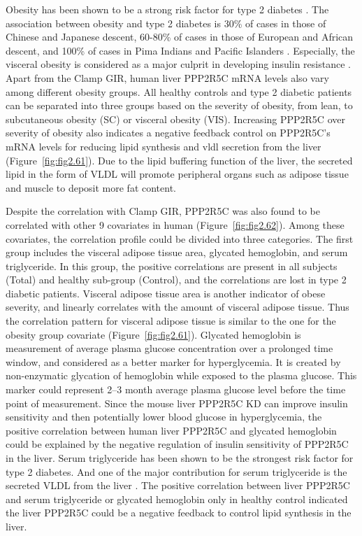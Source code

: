 Obesity has been shown to be a strong risk factor for type 2 diabetes \cite{stumvoll_type_2005}. The association between obesity and type 2 diabetes is 30\% of cases in those of Chinese and Japanese descent, 60-80\% of cases in those of European and African descent, and 100\% of cases in Pima Indians and Pacific Islanders \cite{gardner_greenspans_2011}. Especially, the visceral obesity is considered as a major culprit in developing insulin resistance \cite{patel_body_2013,bentham_science_publisher_metabolic_2006}. Apart from the Clamp GIR, human liver PPP2R5C mRNA levels also vary among different obesity groups. All healthy controls and type 2 diabetic patients can be separated into three groups based on the severity of obesity, from lean, to subcutaneous obesity (SC) or visceral obesity (VIS).  Increasing PPP2R5C over severity of obesity also indicates a negative feedback control on PPP2R5C's mRNA levels for reducing lipid synthesis and \gls{vldl} secretion from the liver (Figure~\ref{fig:fig2.61}). Due to the lipid buffering function of the liver, the secreted lipid in the form of VLDL will promote peripheral organs such as adipose tissue and muscle to deposit more fat content.


Despite the correlation with Clamp GIR, PPP2R5C was also found to be correlated with other 9 covariates in human (Figure~\ref{fig:fig2.62}). Among these covariates, the correlation profile could be divided into three categories. The first group includes the visceral adipose tissue area, glycated hemoglobin, and serum triglyceride. In this group, the positive correlations are present in all subjects (Total) and healthy sub-group (Control), and the correlations are lost in type 2 diabetic patients. Visceral adipose tissue area is another indicator of obese severity, and linearly correlates with the amount of visceral adipose tissue. Thus the correlation pattern for visceral adipose tissue is similar to the one for the obesity group covariate (Figure~\ref{fig:fig2.61}). Glycated hemoglobin is measurement of average plasma glucose concentration over a prolonged time window, and considered as a better marker for hyperglycemia. It is created by non-enzymatic glycation of hemoglobin while exposed to the plasma glucose. This marker could represent 2--3 month average plasma glucose level before the time point of measurement. Since the mouse liver PPP2R5C KD can improve insulin sensitivity and then potentially lower blood glucose in hyperglycemia, the positive correlation between human liver PPP2R5C and glycated hemoglobin could be explained by the negative regulation of insulin sensitivity of PPP2R5C in the liver. Serum triglyceride has been shown to be the strongest risk factor for type 2 diabetes. And one of the major contribution for serum triglyceride is the secreted VLDL from the liver \cite{kompoti_elevated_2006}. The positive correlation between liver PPP2R5C and serum triglyceride or glycated hemoglobin only in healthy control indicated the liver PPP2R5C could be a negative feedback to control lipid synthesis in the liver.

